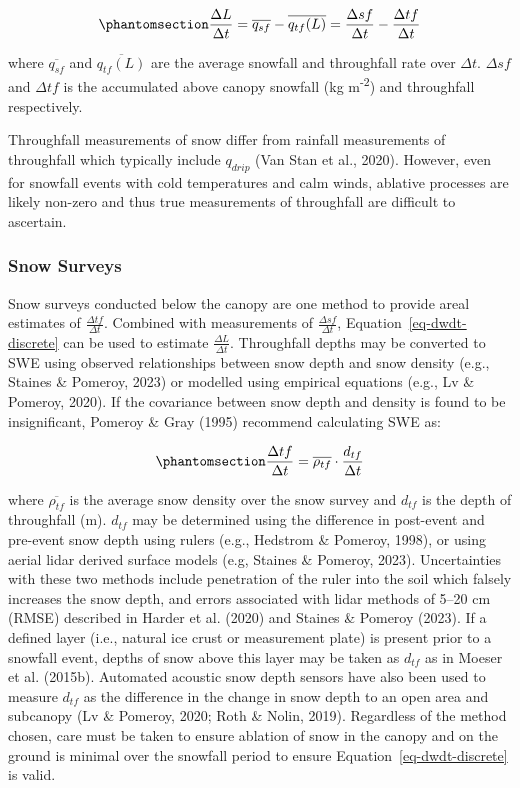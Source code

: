 \documentclass[
  letterpaper,
]{tex/uofsthesis-cs}
\begin{document}
\begin{equation}\phantomsection\label{eq-dwdt-discrete}{
\frac{\Delta L}{\Delta t} = \overline{q_{sf}}-\overline{q_{tf}(L)} = \frac{\Delta sf}{\Delta t} - \frac{\Delta tf}{\Delta t}
}\end{equation}

where \(\overline{q_{sf}}\) and \(\overline{q_{tf}(L)}\) are the average
snowfall and throughfall rate over \(\Delta t\). \(\Delta sf\) and
\(\Delta tf\) is the accumulated above canopy snowfall (kg
m\textsuperscript{-2}) and throughfall respectively.

Throughfall measurements of snow differ from rainfall measurements of
throughfall which typically include \(q_{drip}\) (Van Stan et al.,
2020). However, even for snowfall events with cold temperatures and calm
winds, ablative processes are likely non-zero and thus true measurements
of throughfall are difficult to ascertain.

\subsubsection{Snow Surveys}\label{sec-snow-surveys}

Snow surveys conducted below the canopy are one method to provide areal
estimates of \(\frac{\Delta tf}{\Delta t}\). Combined with measurements
of \(\frac{\Delta sf}{\Delta t}\), Equation~\ref{eq-dwdt-discrete} can
be used to estimate \(\frac{\Delta L}{\Delta t}\). Throughfall depths
may be converted to SWE using observed relationships between snow depth
and snow density (e.g., Staines \& Pomeroy, 2023) or modelled using
empirical equations (e.g., Lv \& Pomeroy, 2020). If the covariance
between snow depth and density is found to be insignificant, Pomeroy \&
Gray (1995) recommend calculating SWE as:

\begin{equation}\phantomsection\label{eq-sweins}{
\frac{\Delta tf}{\Delta t} = \overline{\rho_{tf}} \cdot \frac{d_{ tf}}{\Delta t}
}\end{equation}

where \(\overline{\rho_{tf}}\) is the average snow density over the snow
survey and \(d_{tf}\) is the depth of throughfall (m). \(d_{tf}\) may be
determined using the difference in post-event and pre-event snow depth
using rulers (e.g., Hedstrom \& Pomeroy, 1998), or using aerial lidar
derived surface models (e.g, Staines \& Pomeroy, 2023). Uncertainties
with these two methods include penetration of the ruler into the soil
which falsely increases the snow depth, and errors associated with lidar
methods of 5--20 cm (RMSE) described in Harder et al. (2020) and Staines
\& Pomeroy (2023). If a defined layer (i.e., natural ice crust or
measurement plate) is present prior to a snowfall event, depths of snow
above this layer may be taken as \(d_{tf}\) as in Moeser et al. (2015b).
Automated acoustic snow depth sensors have also been used to measure
\(d_{tf}\) as the difference in the change in snow depth to an open area
and subcanopy (Lv \& Pomeroy, 2020; Roth \& Nolin, 2019). Regardless of
the method chosen, care must be taken to ensure ablation of snow in the
canopy and on the ground is minimal over the snowfall period to ensure
Equation~\ref{eq-dwdt-discrete} is valid.
\end{document}

